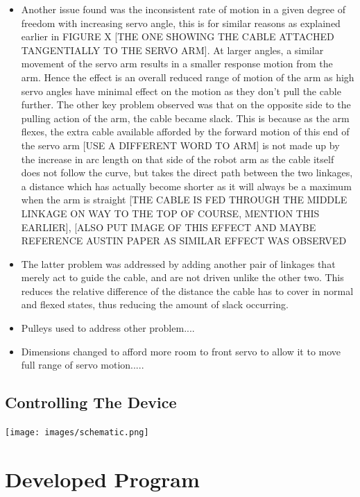 \documentclass[11pt]{article}
\begin{document}
\begin{itemize}
\item{Another issue found was the inconsistent rate of motion in a given degree of freedom with increasing servo angle, this is for similar reasons as explained earlier in FIGURE X [THE ONE SHOWING THE CABLE ATTACHED TANGENTIALLY TO THE SERVO ARM]. At larger angles, a similar movement of the servo arm results in a smaller response motion from the arm. Hence the effect is an overall reduced range of motion of the arm as high servo angles have minimal effect on the motion as they don't pull the cable further. The other key problem observed was that on the opposite side to the pulling action of the arm, the cable became slack. This is because as the arm flexes, the extra cable available afforded by the forward motion of this end of the servo arm [USE A DIFFERENT WORD TO ARM] is not made up by the increase in arc length on that side of the robot arm  as the cable itself does not follow the curve, but takes the  direct path between the two linkages, a distance which has actually become shorter as it will always be a maximum when the arm is straight [THE CABLE IS FED THROUGH THE MIDDLE LINKAGE ON WAY TO THE TOP OF COURSE, MENTION THIS EARLIER], [ALSO PUT IMAGE OF THIS EFFECT AND MAYBE REFERENCE AUSTIN PAPER AS SIMILAR EFFECT WAS OBSERVED}
\item{The latter problem was addressed by adding another pair of linkages that merely act to guide the cable, and are not driven unlike the other two. This reduces the relative difference of the distance the cable has to cover in normal and flexed states, thus reducing the amount of slack occurring.}
\item{Pulleys used to address other problem....}
\item{Dimensions changed to afford more room to front servo to allow it to move full range of servo motion.....} 
\end{itemize}

\subsection{Controlling The Device}

\begin{center}
\texttt{[image: images/schematic.png]}
\label{figure:schematic}
\end{center}

\pagebreak
\section{Developed Program}
\end{document}
